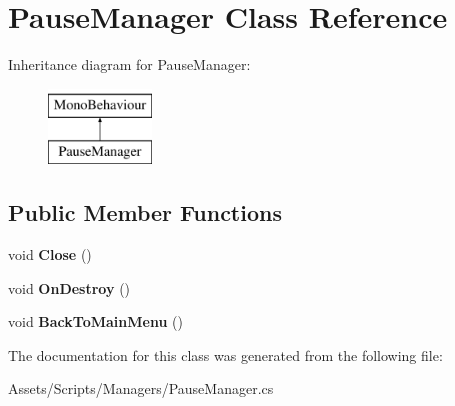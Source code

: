 \hypertarget{class_pause_manager}{}\section{Pause\+Manager Class Reference}
\label{class_pause_manager}
Inheritance diagram for Pause\+Manager\+:\begin{figure}[H]
\begin{center}
\leavevmode
\includegraphics[height=2.000000cm]{class_pause_manager}
\end{center}
\end{figure}
\subsection*{Public Member Functions}
\begin{DoxyCompactItemize}
\item 
void {\bfseries Close} ()\hypertarget{class_pause_manager_ab68a1e034aca538ab91a0c83a00c43f6}{}\label{class_pause_manager_ab68a1e034aca538ab91a0c83a00c43f6}

\item 
void {\bfseries On\+Destroy} ()\hypertarget{class_pause_manager_a47f82ac249b2118cc145f11dcf47c1a3}{}\label{class_pause_manager_a47f82ac249b2118cc145f11dcf47c1a3}

\item 
void {\bfseries Back\+To\+Main\+Menu} ()\hypertarget{class_pause_manager_ad1a0bced2184deab10448274ab77b351}{}\label{class_pause_manager_ad1a0bced2184deab10448274ab77b351}

\end{DoxyCompactItemize}


The documentation for this class was generated from the following file\+:\begin{DoxyCompactItemize}
\item 
Assets/\+Scripts/\+Managers/Pause\+Manager.\+cs\end{DoxyCompactItemize}
